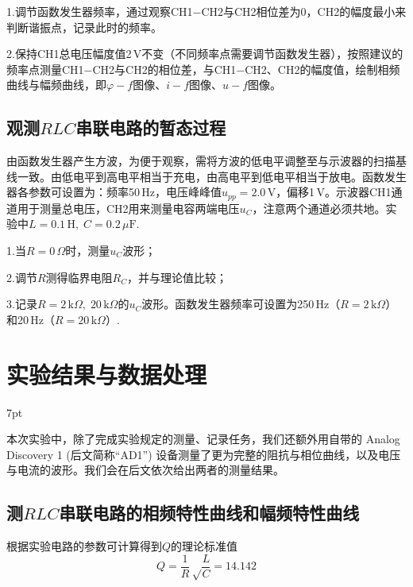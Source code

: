 \documentclass[UTF8]{article}
\theoremstyle{MyLineTheoremStyle} %
\theoremstyle{MyBlockTheoremStyle} %
\theoremstyle{MySubsubsectionStyle} %
\newenvironment{graybox}{%
        \def\FrameCommand{%
        \hspace{1pt}%
        {\color{gray}\vrule width 2pt}%
        {\color{graybox_color}\vrule width 4pt}%
        \colorbox{graybox_color}%
        }%
        \MakeFramed{\advance\hsize-\width\FrameRestore}%
        \noindent\hspace{-4.55pt}%
        \begin{adjustwidth}{}{7pt}%
        \vspace{2pt}\vspace{2pt}%
        }
        {%
        \vspace{2pt}\end{adjustwidth}\endMakeFramed%
        }
\begin{document}
1.调节函数发生器频率，通过观察CH1$ - $CH2与CH2相位差为0，CH2的幅度最小来判断谐振点，记录此时的频率。

2.保持CH1总电压幅度值2\,V不变（不同频率点需要调节函数发生器），按照建议的频率点测量CH1$ - $CH2与CH2的相位差，与CH1$ - $CH2、CH2的幅度值，绘制相频曲线与幅频曲线，即$ \varphi-f $图像、$ i-f $图像、$ u-f $图像。

\subsection{观测$ RLC $串联电路的暂态过程}
由函数发生器产生方波，为便于观察，需将方波的低电平调整至与示波器的扫描基线一致。由低电平到高电平相当于充电，由高电平到低电平相当于放电。函数发生器各参数可设置为：频率50\,Hz，电压峰峰值$ u_{pp}=2.0\,\mathrm V $，偏移1\,V。示波器CH1通道用于测量总电压，CH2用来测量电容两端电压$ u_C $，注意两个通道必须共地。实验中$ L=0.1\,\mathrm H,\;C=0.2\,\mu\mathrm F $.

1.当$ R=0\,\Omega $时，测量$ u_C $波形；

2.调节$ R $测得临界电阻$ R_C $，并与理论值比较；

3.记录$ R=2\,\mathrm{k}\Omega,\;20\,\mathrm k\Omega $的$ u_C $波形。函数发生器频率可设置为250\,Hz（$ R=2\,\mathrm k\Omega $）和20\,Hz（$ R=20\,\mathrm k\Omega $）.

\section{实验结果与数据处理}

\begin{graybox}
    本次实验中，除了完成实验规定的测量、记录任务，我们还额外用自带的 Analog Discovery 1 (后文简称“AD1”) 设备测量了更为完整的阻抗与相位曲线，以及电压与电流的波形。我们会在后文依次给出两者的测量结果。
\end{graybox}

\subsection{测$ RLC $串联电路的相频特性曲线和幅频特性曲线}
根据实验电路的参数可计算得到$ Q $的理论标准值
\begin{equation}
Q=\frac1R\sqrt\frac LC = 14.142
\end{equation}
\end{document}
